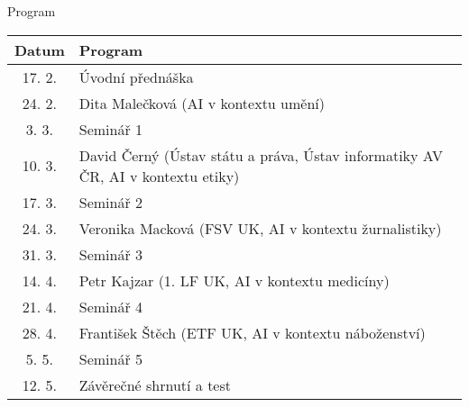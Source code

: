 \begin{frame}{Program}

    \small
    \begin{tabular}{cl}
        \toprule
    Datum   &   Program \\ \midrule
    17. 2.  & Úvodní přednáška \\ \midrule
    24. 2.  & Dita Malečková (AI v kontextu umění) \\
    3. 3.   & Seminář 1 \\ \midrule
    10. 3.  & David Černý (Ústav státu a práva, Ústav informatiky AV ČR, AI v kontextu etiky) \\
    17. 3.  & Seminář 2 \\ \midrule
    24. 3.  & Veronika Macková (FSV UK, AI v kontextu žurnalistiky) \\
    31. 3.  & Seminář 3 \\ \midrule
    14. 4.  & Petr Kajzar (1. LF UK, AI v kontextu medicíny) \\
    21. 4.  & Seminář 4 \\ \midrule
    28. 4.  & František Štěch (ETF UK, AI v kontextu náboženství) \\
    5. 5.   & Seminář 5 \\ \midrule
    12. 5.  & Závěrečné shrnutí a test \\
    \bottomrule
    \end{tabular}


\end{frame}

